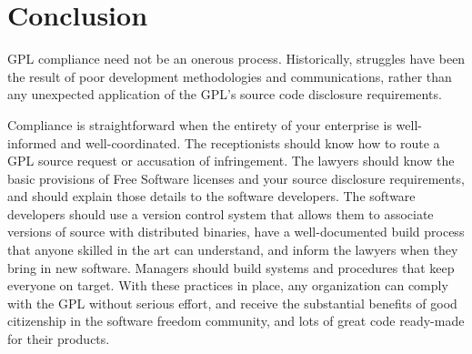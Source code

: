 \chapter{Conclusion}

GPL compliance need not be an onerous process.  Historically, struggles
have been the result of poor development methodologies and communications,
rather than any unexpected application of the GPL's source code disclosure
requirements.

Compliance is straightforward when the entirety of your enterprise is
well-informed and well-coordinated.  The receptionists should know how to
route a GPL source request or accusation of infringement.  The lawyers
should know the basic provisions of Free Software licenses and your source
disclosure requirements, and should explain those details to the software
developers.  The software developers should use a version control system
that allows them to associate versions of source with distributed
binaries, have a well-documented build process that anyone skilled in the
art can understand, and inform the lawyers when they bring in new
software.  Managers should build systems and procedures that keep everyone
on target.  With these practices in place, any organization can comply
with the GPL without serious effort, and receive the substantial benefits
of good citizenship in the software freedom community, and lots of great code
ready-made for their products.

\vfill

